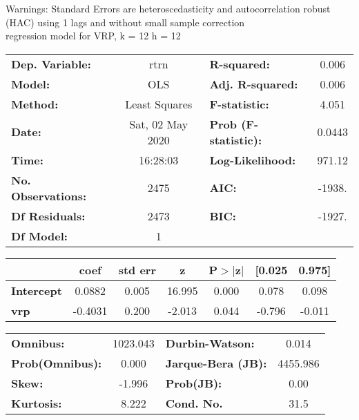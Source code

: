 Warnings: \newline
 [1] Standard Errors are heteroscedasticity and autocorrelation robust (HAC) using 1 lags and without small sample correction\\ 

regression model for VRP, k = 12 h = 12\begin{center}
\begin{tabular}{lclc}
\toprule
\textbf{Dep. Variable:}    &       rtrn       & \textbf{  R-squared:         } &     0.006   \\
\textbf{Model:}            &       OLS        & \textbf{  Adj. R-squared:    } &     0.006   \\
\textbf{Method:}           &  Least Squares   & \textbf{  F-statistic:       } &     4.051   \\
\textbf{Date:}             & Sat, 02 May 2020 & \textbf{  Prob (F-statistic):} &   0.0443    \\
\textbf{Time:}             &     16:28:03     & \textbf{  Log-Likelihood:    } &    971.12   \\
\textbf{No. Observations:} &        2475      & \textbf{  AIC:               } &    -1938.   \\
\textbf{Df Residuals:}     &        2473      & \textbf{  BIC:               } &    -1927.   \\
\textbf{Df Model:}         &           1      & \textbf{                     } &             \\
\bottomrule
\end{tabular}
\begin{tabular}{lcccccc}
                   & \textbf{coef} & \textbf{std err} & \textbf{z} & \textbf{P$> |$z$|$} & \textbf{[0.025} & \textbf{0.975]}  \\
\midrule
\textbf{Intercept} &       0.0882  &        0.005     &    16.995  &         0.000        &        0.078    &        0.098     \\
\textbf{vrp}       &      -0.4031  &        0.200     &    -2.013  &         0.044        &       -0.796    &       -0.011     \\
\bottomrule
\end{tabular}
\begin{tabular}{lclc}
\textbf{Omnibus:}       & 1023.043 & \textbf{  Durbin-Watson:     } &    0.014  \\
\textbf{Prob(Omnibus):} &   0.000  & \textbf{  Jarque-Bera (JB):  } & 4455.986  \\
\textbf{Skew:}          &  -1.996  & \textbf{  Prob(JB):          } &     0.00  \\
\textbf{Kurtosis:}      &   8.222  & \textbf{  Cond. No.          } &     31.5  \\
\bottomrule
\end{tabular}
\end{center}

